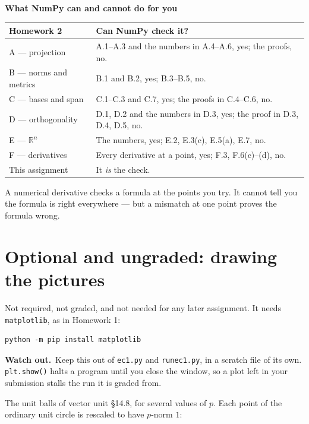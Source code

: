 \documentclass[11pt]{article}
\newcommand{\heads}[1]{\par\smallskip\noindent
  {\small\sffamily\textcolor{BrickRed}{\textbf{Watch out.}}\ #1}\par\smallskip}
\newenvironment{callout}[1]
  {\par\medskip\needspace{5\baselineskip}%
   \begin{lrbox}{\qcbox}%
   \begin{minipage}{\dimexpr\textwidth-2\fboxsep-4pt}%
   \setlength{\parskip}{0.4em}%
   \textbf{\sffamily\color{RoyalBlue}#1}\par}
  {\end{minipage}\end{lrbox}%
   \begin{center}\colorbox{softbg}{\usebox{\qcbox}}\end{center}\medskip}
\newcommand{\R}{\mathbb{R}}
\begin{document}
\begin{callout}{What NumPy can and cannot do for you}
\renewcommand{\arraystretch}{1.25}
\begin{tabular}{@{}l >{\raggedright\arraybackslash}p{10.4cm}@{}}
\toprule
\textbf{Homework 2} & \textbf{Can NumPy check it?} \\
\midrule
A --- projection         & A.1--A.3 and the numbers in A.4--A.6, yes; the proofs, no. \\
B --- norms and metrics  & B.1 and B.2, yes; B.3--B.5, no. \\
C --- bases and span     & C.1--C.3 and C.7, yes; the proofs in C.4--C.6, no. \\
D --- orthogonality      & D.1, D.2 and the numbers in D.3, yes; the proof in D.3, D.4, D.5, no. \\
E --- $\R^{n}$           & The numbers, yes; E.2, E.3(c), E.5(a), E.7, no. \\
F --- derivatives        & Every derivative at a point, yes; F.3, F.6(c)--(d), no. \\
\midrule
This assignment          & It \emph{is} the check. \\
\bottomrule
\end{tabular}

\smallskip
A numerical derivative checks a formula at the points you try. It cannot tell you
the formula is right everywhere --- but a mismatch at one point proves the
formula wrong.
\end{callout}

\section{Optional and ungraded: drawing the pictures}
\noindent Not required, not graded, and not needed for any later assignment. It
needs \texttt{matplotlib}, as in Homework 1:

\begin{lstlisting}
python -m pip install matplotlib
\end{lstlisting}

\heads{Keep this out of \texttt{ec1.py} and \texttt{runec1.py}, in a scratch file
of its own. \texttt{plt.show()} halts a program until you close the window, so a
plot left in your submission stalls the run it is graded from.}

\noindent The unit balls of vector unit \S14.8, for several values of $p$. Each
point of the ordinary unit circle is rescaled to have $p$-norm $1$:
\end{document}
